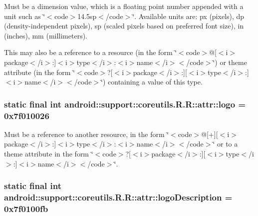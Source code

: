 Must be a dimension value, which is a floating point number appended with a unit such as \char`\"{}$<$code$>$14.5sp$<$/code$>$\char`\"{}. Available units are: px (pixels), dp (density-independent pixels), sp (scaled pixels based on preferred font size), in (inches), mm (millimeters). 

This may also be a reference to a resource (in the form \char`\"{}$<$code$>$@\mbox{[}$<$i$>$package$<$/i$>$:\mbox{]}$<$i$>$type$<$/i$>$:$<$i$>$name$<$/i$>$$<$/code$>$\char`\"{}) or theme attribute (in the form \char`\"{}$<$code$>$?\mbox{[}$<$i$>$package$<$/i$>$:\mbox{]}\mbox{[}$<$i$>$type$<$/i$>$:\mbox{]}$<$i$>$name$<$/i$>$$<$/code$>$\char`\"{}) containing a value of this type. \hypertarget{classandroid_1_1support_1_1coreutils_1_1_r_1_1attr_a245cd9aff7e13a30bcf14f57881e74a}{
\subsubsection[{logo}]{\setlength{\rightskip}{0pt plus 5cm}static final int android::support::coreutils.R.R::attr::logo = 0x7f010026}}
\label{classandroid_1_1support_1_1coreutils_1_1_r_1_1attr_a245cd9aff7e13a30bcf14f57881e74a}


Must be a reference to another resource, in the form \char`\"{}$<$code$>$@\mbox{[}+\mbox{]}\mbox{[}$<$i$>$package$<$/i$>$:\mbox{]}$<$i$>$type$<$/i$>$:$<$i$>$name$<$/i$>$$<$/code$>$\char`\"{} or to a theme attribute in the form \char`\"{}$<$code$>$?\mbox{[}$<$i$>$package$<$/i$>$:\mbox{]}\mbox{[}$<$i$>$type$<$/i$>$:\mbox{]}$<$i$>$name$<$/i$>$$<$/code$>$\char`\"{}. \hypertarget{classandroid_1_1support_1_1coreutils_1_1_r_1_1attr_567e5f691fe8518a4e1664c044927155}{
\subsubsection[{logoDescription}]{\setlength{\rightskip}{0pt plus 5cm}static final int android::support::coreutils.R.R::attr::logoDescription = 0x7f0100fb}}
\label{classandroid_1_1support_1_1coreutils_1_1_r_1_1attr_567e5f691fe8518a4e1664c044927155}


